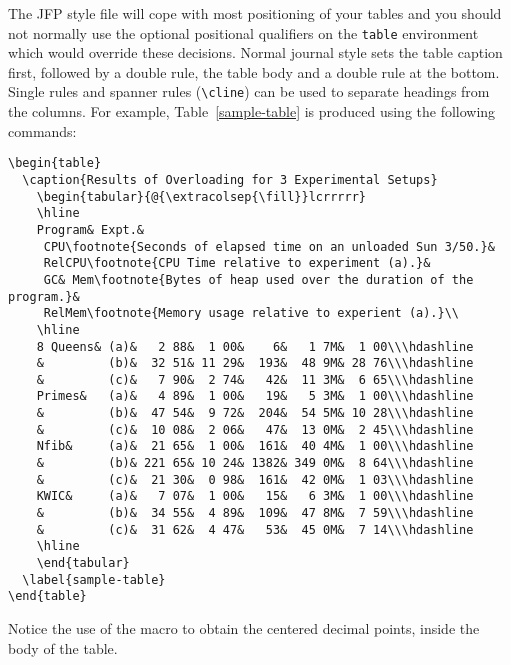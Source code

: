 \documentclass{jfp}
\begin{document}
The JFP style file will cope with most positioning of your tables
and you should not normally use the optional positional qualifiers on the
\verb"table" environment which would override these decisions.
Normal journal style sets the table caption first, followed by a double
rule, the table body and a double rule at the bottom.  Single rules and
spanner rules (\verb"\cline") can be used to separate headings from the
columns.  For example, Table~\ref{sample-table} is produced using the
following commands:\par
%
{\fontsize{7}{9}\selectfont
\begin{verbatim}
\begin{table}
  \caption{Results of Overloading for 3 Experimental Setups}
    \begin{tabular}{@{\extracolsep{\fill}}lcrrrrr}
    \hline
    Program& Expt.&
     CPU\footnote{Seconds of elapsed time on an unloaded Sun 3/50.}&
     RelCPU\footnote{CPU Time relative to experiment (a).}&
     GC& Mem\footnote{Bytes of heap used over the duration of the program.}&
     RelMem\footnote{Memory usage relative to experient (a).}\\
    \hline
    8 Queens& (a)&   2 88&  1 00&    6&   1 7M&  1 00\\\hdashline
    &         (b)&  32 51& 11 29&  193&  48 9M& 28 76\\\hdashline
    &         (c)&   7 90&  2 74&   42&  11 3M&  6 65\\\hdashline
    Primes&   (a)&   4 89&  1 00&   19&   5 3M&  1 00\\\hdashline
    &         (b)&  47 54&  9 72&  204&  54 5M& 10 28\\\hdashline
    &         (c)&  10 08&  2 06&   47&  13 0M&  2 45\\\hdashline
    Nfib&     (a)&  21 65&  1 00&  161&  40 4M&  1 00\\\hdashline
    &         (b)& 221 65& 10 24& 1382& 349 0M&  8 64\\\hdashline
    &         (c)&  21 30&  0 98&  161&  42 0M&  1 03\\\hdashline
    KWIC&     (a)&   7 07&  1 00&   15&   6 3M&  1 00\\\hdashline
    &         (b)&  34 55&  4 89&  109&  47 8M&  7 59\\\hdashline
    &         (c)&  31 62&  4 47&   53&  45 0M&  7 14\\\hdashline
    \hline
    \end{tabular}
  \label{sample-table}
\end{table}
\end{verbatim}}
%
\noindent Notice the use of the \verb"" macro to obtain the centered
decimal points, inside the body of the table.
\end{document}
